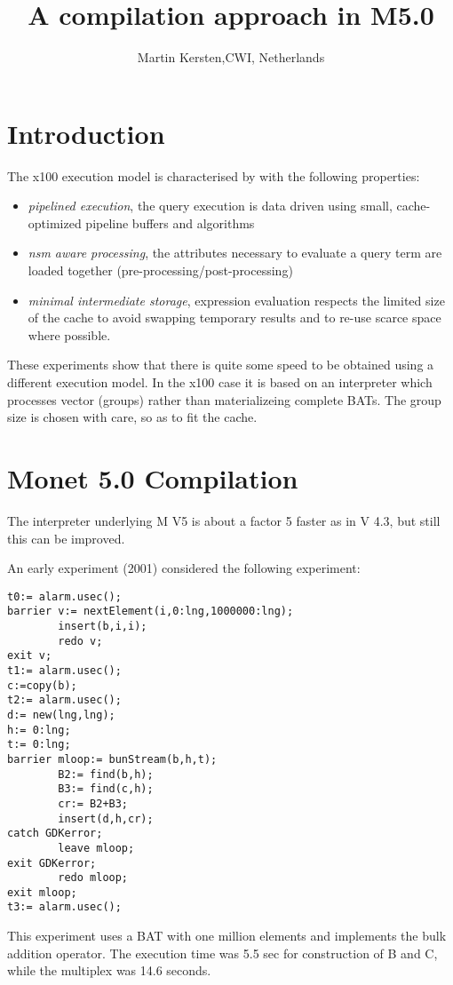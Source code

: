 \documentclass[10pt,twocolumn,fleqn]{article}
\begin{document}
\title{A compilation approach in M5.0}
\author{ Martin Kersten,{\small \textsc{CWI}, Netherlands}}
\date{}
\maketitle

\section{Introduction}
The x100 execution model is characterised by with the following properties:
\begin{itemize}
\item {\em pipelined execution}, the query execution is data driven using 
small, cache-optimized pipeline buffers and algorithms
\item{\em nsm aware processing}, the attributes necessary to evaluate a 
query term are loaded together (pre-processing/post-processing)
\item{\em minimal intermediate storage}, expression evaluation respects 
the limited size of the cache to avoid swapping temporary results and
to re-use scarce space where possible.
\end{itemize}

These experiments show that there is quite some speed to be obtained
using a different execution model. In the x100 case it is based on
an interpreter which processes vector (groups) rather than materializeing
complete BATs. The group size is chosen with care, so as to fit the cache.

\section{Monet 5.0 Compilation}
The interpreter underlying M V5 is about a factor 5 faster as in V 4.3, but
still this can be improved. 

An early experiment (2001) considered the following experiment:
\begin{verbatim}
t0:= alarm.usec();
barrier v:= nextElement(i,0:lng,1000000:lng);
        insert(b,i,i);
        redo v;
exit v;
t1:= alarm.usec();
c:=copy(b);
t2:= alarm.usec();
d:= new(lng,lng);
h:= 0:lng;
t:= 0:lng;
barrier mloop:= bunStream(b,h,t);
        B2:= find(b,h);
        B3:= find(c,h);
        cr:= B2+B3;
        insert(d,h,cr);
catch GDKerror;
        leave mloop;
exit GDKerror;
        redo mloop;
exit mloop;
t3:= alarm.usec();
\end{verbatim}
This experiment uses a BAT with one million elements and implements the
bulk addition operator. The execution time was 5.5 sec for construction
of B and C, while the multiplex was 14.6 seconds.
\end{document}
